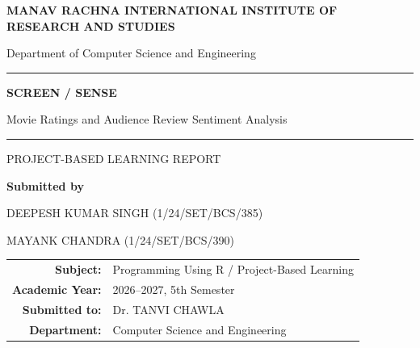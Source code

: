 \documentclass[12pt,a4paper]{report}
\begin{document}
\begin{titlepage}
  \centering
  \vspace*{1.1cm}
  {\Large\bfseries MANAV RACHNA INTERNATIONAL INSTITUTE OF RESEARCH AND STUDIES\par}
  \vspace{0.25cm}
  {\large Department of Computer Science and Engineering\par}
  \vspace{1.6cm}
  {\color{teal}\rule{0.85\textwidth}{1.2pt}\par}
  \vspace{0.5cm}
  {\Huge\bfseries SCREEN / SENSE\par}
  \vspace{0.25cm}
  {\Large Movie Ratings and Audience Review Sentiment Analysis\par}
  \vspace{0.5cm}
  {\color{teal}\rule{0.85\textwidth}{1.2pt}\par}
  \vspace{1.0cm}
  {\large PROJECT-BASED LEARNING REPORT\par}
  \vspace{1.0cm}
  \begin{minipage}{0.78\textwidth}
    \centering
    \textbf{Submitted by}\par\vspace{0.3cm}
    DEEPESH KUMAR SINGH (1/24/SET/BCS/385)\par
    MAYANK CHANDRA (1/24/SET/BCS/390)
   
  \end{minipage}
  \vspace{0.9cm}

  \begin{tabular}{rl}
    \textbf{Subject:} & Programming Using R / Project-Based Learning \\
    \textbf{Academic Year:} & 2026--2027, 5th Semester \\
    \textbf{Submitted to:} & Dr. TANVI CHAWLA \\
    \textbf{Department:} & Computer Science and Engineering
  \end{tabular}
  \vfill
\end{titlepage}

\tableofcontents
\clearpage
{}
\end{document}

